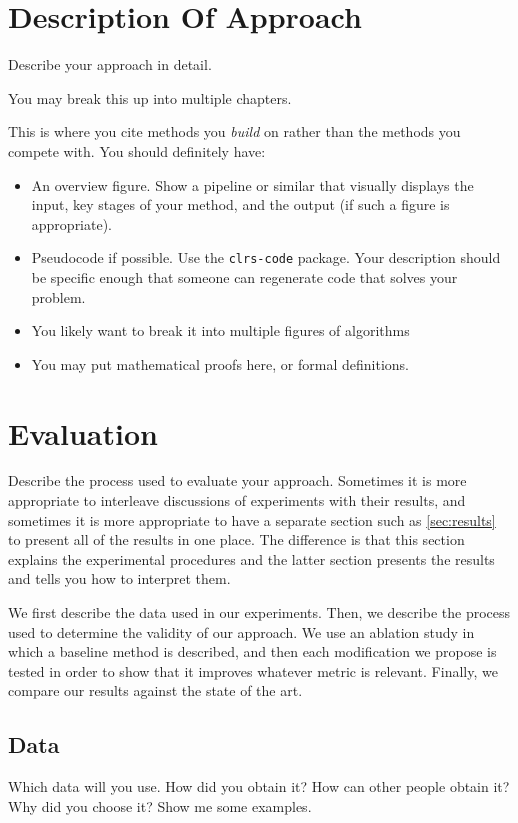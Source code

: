 \section{Description Of Approach}
Describe your approach in detail.


You may break this up into multiple chapters.


This is where you cite methods you \textit{build} on rather than the methods you compete with.
You should definitely have:
\begin{itemize}
    \item An overview figure. Show a pipeline or similar that visually displays the input, key stages of your method, and the output (if such a figure is appropriate).
    \item Pseudocode if possible. Use the \texttt{clrs-code} package. Your description should be specific enough that someone can regenerate code that solves your problem.
    \item You likely want to break it into multiple figures of algorithms
    \item You may put mathematical proofs here, or formal definitions.
\end{itemize}
\section{Evaluation}
Describe the process used to evaluate your approach.
Sometimes it is more appropriate to interleave discussions of experiments with their results, and sometimes it is more appropriate to have a separate section such as \autoref{sec:results} to present all of the results in one place. The difference is that this section explains the experimental procedures and the latter section presents the results and tells you how to interpret them.

We first describe the data used in our experiments. Then, we describe the process used to determine the validity of our approach. We use an ablation study in which a baseline method is described, and then each modification we propose is tested in order to show that it improves {\color{red} whatever metric is relevant}.  Finally, we compare our results against the state of the art.

\subsection{Data}
Which data will you use. How did you obtain it? How can other people obtain it? Why did you choose it? Show me some examples.

